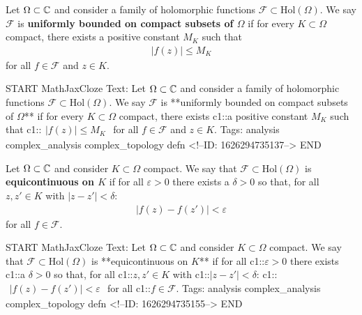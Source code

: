 \documentclass{memoir}
\begin{document}
\begin{defn}
	Let \(\Omega \subset \mathbb{C}\) and consider a family of holomorphic functions \(\mathcal{F}\subset \textrm{Hol}(\Omega )\). We say \(\mathcal{F}\) is \textbf{uniformly bounded on compact subsets of \(\Omega \)} if for every \(K\subset \Omega \) compact, there exists a positive constant \(M_K\) such that
	\begin{align*}
		\left| f(z) \right| \leq M_K
	\end{align*}
	for all \(f \in \mathcal{F}\) and \(z \in K\).
\end{defn}

\begin{anki}
START
MathJaxCloze
Text: Let \(\Omega \subset \mathbb{C}\) and consider a family of holomorphic functions \(\mathcal{F}\subset \textrm{Hol}(\Omega )\). We say \(\mathcal{F}\) is **uniformly bounded on compact subsets of \(\Omega \)** if for every \(K\subset \Omega \) compact, there exists {{c1::a positive constant \(M_K\)}} such that
 {{c1::\(\begin{align*}
        	\left| f(z) \right| \leq M_K
        \end{align*}\)}}
for all \(f \in \mathcal{F}\) and \(z \in K\).
Tags: analysis complex_analysis complex_topology defn
<!--ID: 1626294735137-->
END
\end{anki}

\begin{defn}[Equicontinuous]
	Let \(\Omega \subset \mathbb{C}\) and consider \(K\subset \Omega \) compact. We say that \(\mathcal{F}\subset \textrm{Hol}(\Omega )\) is \textbf{equicontinuous on \(K\)} if for all \(\varepsilon>0\) there exists a \(\delta >0\) so that, for all \(z,z' \in K\) with \(\left| z-z' \right| <\delta \):
	\begin{align*}
		\left| f(z) - f(z')\right| < \varepsilon
	\end{align*}
	for all \(f \in \mathcal{F}\).
\end{defn}

\begin{anki}
START
MathJaxCloze
Text: Let \(\Omega \subset \mathbb{C}\) and consider \(K\subset \Omega \) compact. We say that \(\mathcal{F}\subset \textrm{Hol}(\Omega )\) is **equicontinuous on \(K\)** if for all {{c1::\(\varepsilon>0\)}} there exists {{c1::a \(\delta >0\)}} so that, for all {{c1::\(z,z' \in K\)}} with {{c1::\(\left| z-z' \right| <\delta \)}}:
{{c1::\(\begin{align*}
        	\left| f(z) - f(z')\right| < \varepsilon
        \end{align*}\)}} 
for all {{c1::\(f \in \mathcal{F}\)}}.
Tags: analysis complex_analysis complex_topology defn
<!--ID: 1626294735155-->
END
\end{anki}
\end{document}
